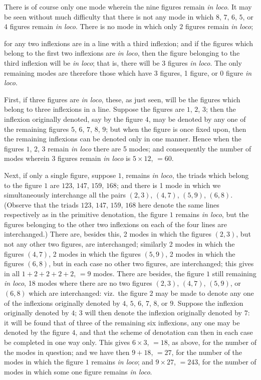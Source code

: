 \documentclass[11pt]{article}
\begin{document}
There is of course only one mode wherein the nine figures remain \emph{in loco}. It may be seen without much difficulty that there is not any mode in which $8$, $7$, $6$, $5$, or $4$ figures remain \emph{in loco}. There is no mode in which only $2$ figures remain \emph{in loco};

\newpage

\noindent for any two inflexions are in a line with a third inflexion; and if the figures which belong to the first two inflexions are \emph{in loco}, then the figure belonging to the third inflexion will be \emph{in loco}; that is, there will be 3 figures \emph{in loco}. The only remaining modes are therefore those which have 3 figures, 1 figure, or 0 figure \emph{in loco}.

First, if three figures are \emph{in loco}, these, as just seen, will be the figures which belong to three inflexions in a line. Suppose the figures are $1$, $2$, $3$; then the inflexion originally denoted, say by the figure $4$, may be denoted by any one of the remaining figures $5$, $6$, $7$, $8$, $9$; but when the figure is once fixed upon, then the remaining inflexions can be denoted only in one manner. Hence when the figures $1$, $2$, $3$ remain \emph{in loco} there are 5 modes; and consequently the number of modes wherein 3 figures remain \emph{in loco} is $5 \times 12$, $=60$.

Next, if only a single figure, suppose $1$, remains \emph{in loco}, the triads which belong to the figure $1$ are $123$, $147$, $159$, $168$; and there is 1 mode in which we simultaneously interchange all the pairs $(2,3)$, $(4,7)$, $(5,9)$, $(6,8)$. (Observe that the triads $123$, $147$, $159$, $168$ here denote the same lines respectively as in the primitive denotation, the figure $1$ remains \emph{in loco}, but the figures belonging to the other two inflexions on each of the four lines are interchanged.) There are, besides this, 2 modes in which the figures $(2,3)$, but not any other two figures, are interchanged; similarly 2 modes in which the figures $(4,7)$, 2 modes in which the figures $(5,9)$, 2 modes in which the figures $(6,8)$, but in each case no other two figures, are interchanged; this gives in all $1+2+2+2+2$, $=9$ modes. There are besides, the figure $1$ still remaining \emph{in loco}, 18 modes where there are no two figures $(2,3)$, $(4,7)$, $(5,9)$, or $(6,8)$ which are interchanged: viz.\ the figure $2$ may be made to denote any one of the inflexions originally denoted by $4$, $5$, $6$, $7$, $8$, or $9$. Suppose the inflexion originally denoted by $4$; $3$ will then denote the inflexion originally denoted by $7$: it will be found that of three of the remaining six inflexions, any one may be denoted by the figure $4$, and that the scheme of denotation can then in each case be completed in one way only. This gives $6 \times 3$, $=18$, as above, for the number of the modes in question; and we have then $9 + 18$, $=27$, for the number of the modes in which the figure $1$ remains \emph{in loco}; and $9 \times 27$, $=243$, for the number of modes in which some one figure remains \emph{in loco}.
\end{document}
